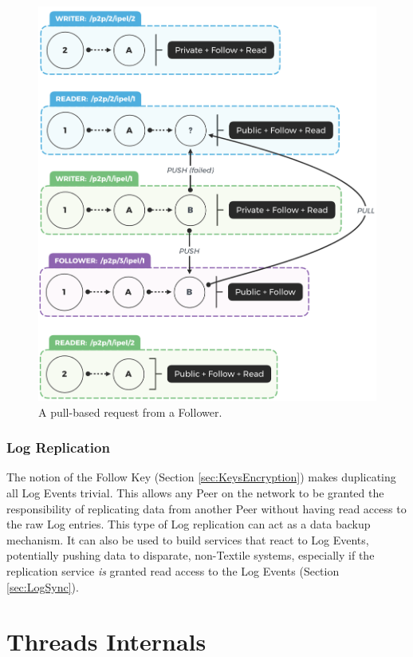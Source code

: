 \documentclass{textile}
\begin{document}
\begin{figure}
  \includegraphics[width=\linewidth]{figures/Pulling.png}
  \caption{A pull-based request from a Follower.}
  \label{fig:Pulling}
\end{figure}

\subsubsection{Log Replication}

The notion of the Follow Key (Section  \ref{sec:KeysEncryption}) makes duplicating all Log Events trivial. This allows any Peer on the network to be granted the responsibility of replicating data from another Peer without having read access to the raw Log entries. This type of Log replication can act as a data backup mechanism. It can also be used to build services that react to Log Events, potentially pushing data to disparate, non-Textile systems, especially if the replication service \emph{is} granted read access to the Log Events (Section  \ref{sec:LogSync}).

\section{Threads Internals}\label{sec:internals}
\end{document}
